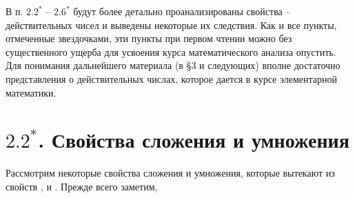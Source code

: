 \documentclass[a4paper]{article}
\newcommand{\RomanNumeralCaps}[1]
{\MakeUppercase{\romannumeral #1}}
\begin{document}
В п. $2.2^*$ -- $2.6^*$ будут более детально проанализированы свойства \RomanNumeralCaps{1}--\RomanNumeralCaps{5} действительных чисел и выведены некоторые их следствия. Как и все пункты, отмеченные звездочками, эти пункты при первом чтении можно без существенного ущерба для усвоения курса математического анализа опустить. Для понимания дальнейшего материала (в \S 3 и следующих) вполне достаточно представления о действительных числах, которое дается в курсе элементарной математики.

\section*{\boldmath$2.2^*$. Свойства сложения и умножения}

Рассмотрим некоторые свойства сложения и умножения, которые вытекают из свойств \RomanNumeralCaps{1}, \RomanNumeralCaps{2} и \RomanNumeralCaps{3}. Прежде всего заметим,
\end{document}
